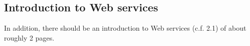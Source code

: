 \subsection{Introduction to Web services }
In addition, there should be an introduction to Web services (c.f. 2.1) of about roughly 2 pages.
